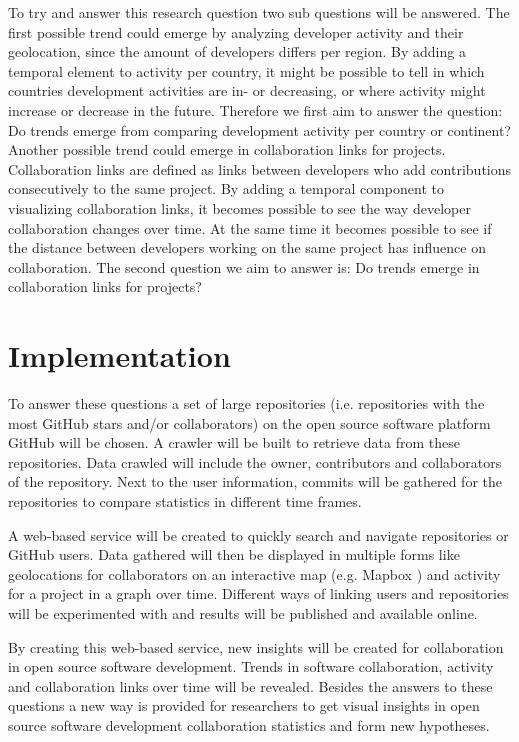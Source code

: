 \documentclass[acmtog, authorversion]{acmart}
\begin{document}
To try and answer this research question two sub questions will be answered. 
The first possible trend could emerge by analyzing developer activity and their geolocation, since the amount of developers differs per region.
By adding a temporal element to activity per country, it might be possible to tell in which countries development activities are in- or decreasing, or where activity might increase or decrease in the future.
Therefore we first aim to answer the question: Do trends emerge from comparing development activity per country or continent?
Another possible trend could emerge in collaboration links for projects.
Collaboration links are defined as links between developers who add contributions consecutively to the same project.
By adding a temporal component to visualizing collaboration links, it becomes possible to see the way developer collaboration changes over time.
At the same time it becomes possible to see if the distance between developers working on the same project has influence on collaboration.
The second question we aim to answer is: Do trends emerge in collaboration links for projects?

\section{Implementation}
To answer these questions a set of large repositories (i.e. repositories with the most GitHub stars and/or collaborators) on the open source software platform GitHub will be chosen.
A crawler will be built to retrieve data from these repositories.
Data crawled will include the owner, contributors and collaborators of the repository.
Next to the user information, commits will be gathered for the repositories to compare statistics in different time frames.

A web-based service will be created to quickly search and navigate repositories or GitHub users.
Data gathered will then be displayed in multiple forms like geolocations for collaborators on an interactive map (e.g. Mapbox \cite{MapBox}) and activity for a project in a graph over time.
Different ways of linking users and repositories will be experimented with and results will be published and available online.

By creating this web-based service, new insights will be created for collaboration in open source software development.
Trends in software collaboration, activity and collaboration links over time will be revealed.
Besides the answers to these questions a new way is provided for researchers to get visual insights in open source software development collaboration statistics and form new hypotheses.



\end{document}
